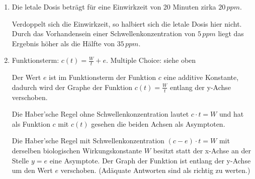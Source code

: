 \begin{langesbeispiel}
{\begin{enumerate}
	\item Die letale Dosis beträgt für eine Einwirkzeit von 20 Minuten zirka $20\,ppm$.
	
	Verdoppelt sich die Einwirkzeit, so halbiert sich die letale Dosis hier nicht. Durch das Vorhandensein einer Schwellenkonzentration von $5\,ppm$ liegt das Ergebnis höher als die Hälfte von $35\,ppm$.
	
	\item Funktionsterm: $c(t)=\frac{W}{t}+e$. Multiple Choice: siehe oben
	
	Der Wert $e$ ist im Funktionsterm der Funktion $c$ eine additive Konstante, dadurch wird der Graphe der Funktion $c(t)=\frac{W}{t}$ entlang der y-Achse verschoben.
	
	Die Haber'sche Regel ohne Schwellenkonzentration lautet $c\cdot t=W$ und hat als Funktion $c$ mit $c(t)$ gesehen die beiden Achsen als Asymptoten.
	
	Die Haber'sche Regel mit Schwellenkonzentration $(c-e)\cdot t=W$ mit derselben biologischen Wirkungskonstante $W$ besitzt statt der x-Achse an der Stelle $y=e$ eine Asymptote. Der Graph der Funktion ist entlang der y-Achse um den Wert $e$ verschoben. (Adäquate Antworten sind als richtig zu werten.)
	\end{enumerate}}
\end{langesbeispiel}